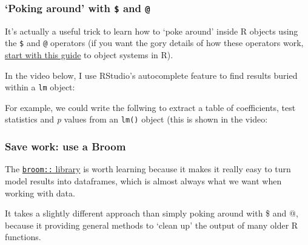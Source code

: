 \documentclass[]{article}
\newenvironment{Shaded}{\begin{snugshade}}{\end{snugshade}}
\newcommand{\KeywordTok}[1]{\textcolor[rgb]{0.13,0.29,0.53}{\textbf{#1}}}
\newcommand{\StringTok}[1]{\textcolor[rgb]{0.31,0.60,0.02}{#1}}
\newcommand{\OperatorTok}[1]{\textcolor[rgb]{0.81,0.36,0.00}{\textbf{#1}}}
\newcommand{\NormalTok}[1]{#1}
\theoremstyle{definition}
\theoremstyle{definition}
\theoremstyle{definition}
\theoremstyle{remark}
\begin{document}
\subsubsection*{\texorpdfstring{`Poking around' with \texttt{\$} and
\texttt{@}}{Poking around with \$ and @}}\label{poking-around-with-and}

It's actually a useful trick to learn how to `poke around' inside R
objects using the \texttt{\$} and \texttt{@} operators (if you want the
gory details of how these operators work,
\href{http://adv-r.had.co.nz/OO-essentials.html}{start with this guide}
to object systems in R).

In the video below, I use RStudio's autocomplete feature to find results
buried within a \texttt{lm} object:

For example, we could write the follwing to extract a table of
coefficients, test statistics and \emph{p} values from an \texttt{lm()}
object (this is shown in the video:

\begin{Shaded}
\end{Shaded}

\subsubsection*{Save work: use a Broom}\label{broom}

The \href{http://varianceexplained.org/r/broom-intro/}{\texttt{broom::}
library} is worth learning because it makes it really easy to turn model
results into dataframes, which is almost always what we want when
working with data.

It takes a slightly different approach than simply poking around with \$
and @, because it providing general methods to `clean up' the output of
many older R functions.
\end{document}
